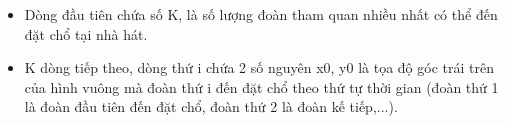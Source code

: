 \begin{itemize}
	\item     Dòng đầu tiên chứa số K, là số lượng đoàn tham quan nhiều nhất có thể đến đặt chổ tại nhà hát.   
	\item     K dòng tiếp theo, dòng thứ i chứa 2 số nguyên x0, y0 là tọa độ góc trái trên của hình vuông mà đoàn thứ i đến đặt chổ theo thứ tự thời gian (đoàn thứ 1 là đoàn đầu tiên đến đặt chổ, đoàn thứ 2 là đoàn kế tiếp,...).   
\end{itemize}